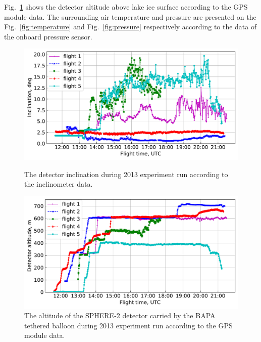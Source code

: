 \documentclass[final,5p,times,twocolumn]{elsarticle}
\begin{document}
Fig.~\ref{fig:height} shows the detector altitude above lake ice surface according to the GPS module data. The surrounding air temperature and pressure are presented on the Fig.~\ref{fig:temperature} and Fig.~\ref{fig:pressure} respectively according to the data of the onboard pressure sensor.

\begin{figure}[tb]
    \begin{minipage}[t]{0.48\textwidth}
    \centering
    \includegraphics[width=\textwidth]{figs/ClinTh.pdf}
    \caption{The detector inclination during 2013 experiment run according to the inclinometer data.}
    \label{fig:inclination} 
    \end{minipage}
    \hfill
    \begin{minipage}[t]{0.48\textwidth}
    \centering
    \includegraphics[width=\textwidth]{figs/height.pdf}
    \caption{The altitude of the SPHERE-2 detector carried by the BAPA tethered balloon during 2013 experiment run according to the GPS module data.}
    \label{fig:height}
    \end{minipage}
    
    \vspace{\baselineskip}
    

\end{figure}
\end{document}
